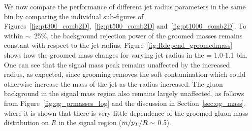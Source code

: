 We now compare the performance of different jet radius parameters in the same \pt bin by comparing the individual sub-figures
 of Figures~\ref{fig:pt300_comb2D},~\ref{fig:pt500_comb2D}
and~\ref{fig:pt1000_comb2D}. To within
$\sim$~25\%, the background rejection power of the groomed masses remains
constant with respect to the jet
radius. Figure~\ref{fig:Rdepend_groomedmass} shows how the groomed
mass changes for varying jet radius in the \pt = 1.0-1.1 \TeV bin. One
can see that the signal mass peak remains unaffected by the increased
radius, as expected, since grooming removes the soft contamination
which could otherwise increase the mass of the jet as the radius
increased. The gluon background in the signal mass region also remains
largely unaffected, as follows from Figure~\ref{fig:qg_prmasses_log}
and the discussion in Section~\ref{sec:qg_mass},
where it is shown that there is very little dependence of the groomed gluon mass
distribution on $R$ in the signal region ($m/p_T/R \sim$ 0.5). 


